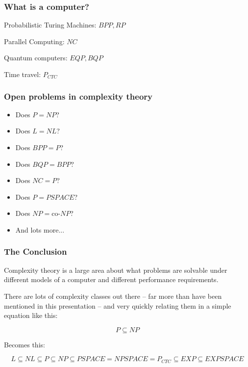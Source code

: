 \documentclass[aspectratio=169]{beamer}
\begin{document}
\begin{frame}
\frametitle{What is a computer?}
Probabilistic Turing Machines: $BPP, RP$

Parallel Computing: $NC$

Quantum computers:  $EQP, BQP$

Time travel: $P_{CTC}$
\end{frame}

\begin{frame}
\frametitle{Open problems in complexity theory}
\begin{itemize}
    \item<1-> Does $P = NP$?
    \item<2-> Does $L = NL$?
    \item<3-> Does $BPP = P$?
    \item<4-> Does $BQP = BPP$?
    \item<5-> Does $NC = P$?
    \item<6-> Does $P = PSPACE$?
    \item<7-> Does $NP = \text{co-}NP$?
    \item<8-> And lots more...
\end{itemize}
\end{frame}

\begin{frame}
\frametitle{The Conclusion}
Complexity theory is a large area about what problems are solvable under different models of a computer and different performance requirements.

There are lots of complexity classes out there -- far more than have been mentioned in this presentation -- and very quickly relating them in a simple equation like this:

$$P \subseteq NP$$

Becomes this:

$$L \subseteq NL \subseteq P \subseteq NP \subseteq PSPACE = NPSPACE = P_{CTC} \subseteq EXP \subseteq EXPSPACE$$
\end{frame}
\end{document}
